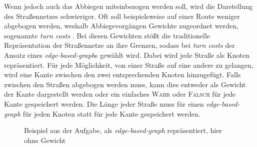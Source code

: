 \documentclass[a4paper,10pt,ngerman]{scrartcl}
\begin{document}
Wenn jedoch auch das Abbiegen miteinbezogen werden soll, wird die Darstellung des Straßennetzes schwieriger.
Oft soll beispielsweise auf einer Route weniger abgebogen werden, weshalb Abbiegevorgängen Gewichte zugeordnet werden, sogenannte \textit{turn costs} \cite{geisberger}.
Bei diesen Gewichten stößt die traditionelle Repräsentation der Straßennetze an ihre Grenzen, sodass bei \textit{turn costs} der Ansatz eines \textit{edge-based-graph}s gewählt wird.
Dabei wird jede Straße als Knoten repräsentiert.
Für jede Möglichkeit, von einer Straße auf eine andere zu gelangen, wird eine Kante zwischen den zwei entsprechenden Knoten hinzugefügt.
Falls zwischen den Straßen abgebogen werden muss, kann dies entweder als Gewicht der Kante dargestellt werden oder ein einfaches \textsc{Wahr} oder \textsc{Falsch} für jede Kante gespeichert werden.
Die Länge jeder Straße muss für einen \textit{edge-based-graph} für jeden Knoten statt für jede Kante gespeichert werden.

\begin{figure}
\centering
{}
\caption{Beispiel aus der Aufgabe, als \textit{edge-based-graph} repräsentiert, hier ohne Gewicht}
\end{figure}
\end{document}
